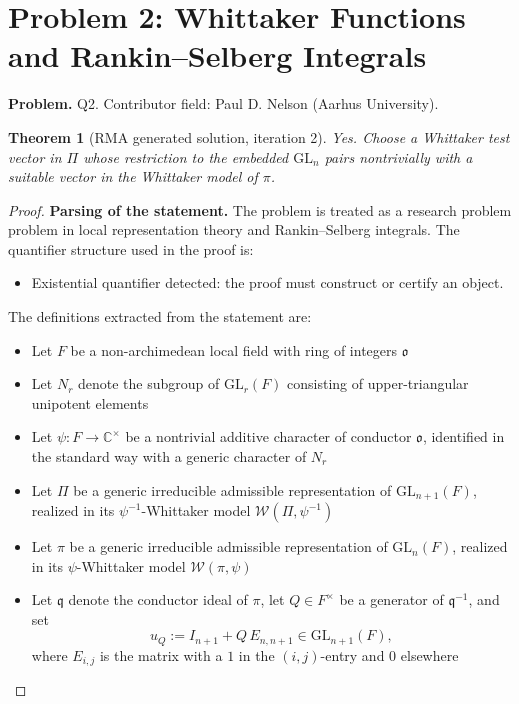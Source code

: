 \documentclass[11pt]{article}
\newtheorem{theorem}{Theorem}
\begin{document}
\section*{Problem 2: Whittaker Functions and Rankin--Selberg Integrals}

\noindent\textbf{Problem.} Q2. Contributor field: Paul D. Nelson (Aarhus University).

\begin{theorem}[RMA generated solution, iteration 2]
Yes. Choose a Whittaker test vector in \(\Pi\) whose restriction to the embedded \(\mathrm{GL}_n\) pairs nontrivially with a suitable vector in the Whittaker model of \(\pi\).
\end{theorem}

\begin{proof}
\textbf{Parsing of the statement.}
The problem is treated as a research problem problem in local representation theory and Rankin--Selberg integrals.
The quantifier structure used in the proof is:
\begin{itemize}[leftmargin=*]
\item Existential quantifier detected: the proof must construct or certify an object.
\end{itemize}
The definitions extracted from the statement are:
\begin{itemize}[leftmargin=*]
\item Let \(F\) be a non-archimedean local field with ring of integers \(\mathfrak o\)
\item Let $N_r$ denote the subgroup of $\mathrm{GL}_{r}(F)$ consisting of upper-triangular unipotent elements
\item Let \(\psi:F\to \mathbb C^\times\) be a nontrivial additive character of conductor \(\mathfrak o\), identified in the standard way with a generic character of $N_r$
\item Let \(\Pi\) be a generic irreducible admissible representation of \(\mathrm{GL}_{n + 1}(F)\), realized in its \(\psi^{-1}\)-Whittaker model \(\mathcal W(\Pi,\psi^{-1})\)
\item Let $\pi$ be a generic irreducible admissible representation of \(\mathrm{GL}_{n}(F)\), realized in its $\psi$-Whittaker model \(\mathcal W(\pi,\psi)\)
\item Let $\mathfrak{q}$ denote the conductor ideal of $\pi$, let \(Q\in F^\times\) be a generator of \(\mathfrak q^{-1}\), and set \[ u_Q := I_{n+1} + Q\,E_{n,n+1} \in \mathrm{GL}_{n + 1}(F), \] where \(E_{i, j}\) is the matrix with a \(1\) in the \((i, j)\)-entry and \(0\) elsewhere
\end{itemize}


\end{proof}
\end{document}
